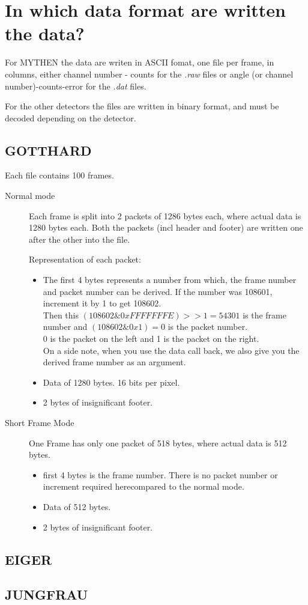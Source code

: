 \section{In which data format are written the data?} \label{sec:dataFormat}

For MYTHEN the data are writen in ASCII fomat, one file per frame, in columns, either channel number - counts for the \textit{.raw} files or angle (or channel number)-counts-error for the \textit{.dat} files.

For the other detectors the files are written in binary format, and must be decoded depending on the detector.

\subsection{GOTTHARD}
Each file contains 100 frames.
\begin{description}
\item[Normal mode]
Each frame is split into 2 packets of 1286 bytes each, where actual data is 1280 bytes each. Both the packets (incl header and footer) are written one after the other into the file.

Representation of each packet:
\begin{itemize}
\item
The first 4 bytes represents a number from which, the frame number and packet number can be derived.
If the number was 108601, increment it by 1 to get 108602.\\
Then this $(108602\&0xFFFFFFFE)>>1 = 54301$ is the frame number
and  $(108602\&0x1) =0$ is the packet number.\\
0 is the packet on the left and 1 is the packet on the right.\\
On a side note, when you use the data call back, we also give you the derived frame number as an argument.

\item Data of 1280 bytes. 16 bits per pixel.

\item  2 bytes of insignificant footer.
\end{itemize}

\item[Short Frame Mode]
One Frame has only one packet of 518 bytes, where actual data is 512 bytes.
\begin{itemize}
\item   first 4 bytes is the frame number. There is no packet number or increment required herecompared to the normal mode.
\item   Data of 512 bytes.
\item   2 bytes of insignificant footer.
\end{itemize}

\end{description}

\subsection{EIGER}

\subsection{JUNGFRAU}
